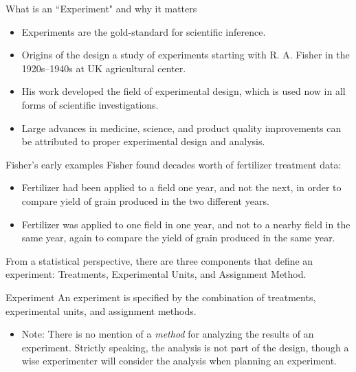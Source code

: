 \begin{frame}[allowframebreaks]{What is an ``Experiment" and why it matters}
  \begin{itemize}
    \item Experiments are the gold-standard for scientific inference.
    \item Origins of the design a study of experiments starting with R. A. Fisher in the 1920s--1940s at UK agricultural center.
    \item His work developed the field of experimental design, which is used now in all forms of scientific investigations.
    \item Large advances in medicine, science, and product quality improvements can be attributed to proper experimental design and analysis.
  \end{itemize}
    \framebreak
    
    \begin{exampleblock}{Fisher's early examples}
      Fisher found decades worth of fertilizer treatment data: 
      \begin{itemize}
        \item Fertilizer had been applied to a field one year, and not the next, in order to compare yield of grain produced in the two different years.
        \item Fertilizer was applied to one field in one year, and not to a nearby field in the same year, again to compare the yield of grain produced in the same year.
      \end{itemize}
    \end{exampleblock}
    
    \framebreak
    
    From a statistical perspective, there are three components that define an experiment: \alert{Treatments}, \alert{Experimental Units}, and \alert{Assignment Method}.
   
   \begin{block}{Experiment}
    An \alert{experiment} is specified by the combination of treatments, experimental units, and assignment methods.
   \end{block}
   
   \begin{itemize}
    \item \alert{Note:} There is no mention of a \emph{method} for analyzing the results of an experiment. Strictly speaking, the analysis is not part of the design, though a wise experimenter will consider the analysis when planning an experiment.
   \end{itemize}
    
\end{frame}

